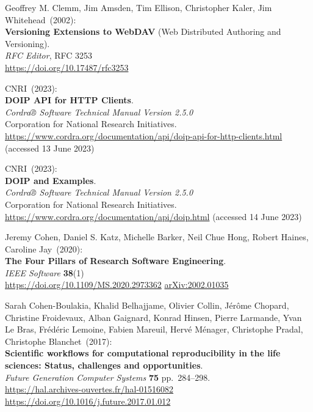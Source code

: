\begin{thebibliography}{9}
Geoffrey M. Clemm, Jim Amsden, Tim Ellison, Christopher Kaler, Jim Whitehead~(2002): \\
\textbf{Versioning Extensions to WebDAV} (Web Distributed Authoring and Versioning).\\
\emph{RFC Editor}, RFC 3253 \\
\url{https://doi.org/10.17487/rfc3253}

CNRI~(2023): \\
\textbf{DOIP API for HTTP Clients}.\\
\emph{Cordra® Software Technical Manual Version 2.5.0}\\
Corporation for National Research Initiatives.\\
\url{https://www.cordra.org/documentation/api/doip-api-for-http-clients.html}
(accessed 13 June 2023)

CNRI~(2023): \\
\textbf{DOIP and Examples}.\\
\emph{Cordra® Software Technical Manual Version 2.5.0}\\
Corporation for National Research Initiatives.\\
\url{https://www.cordra.org/documentation/api/doip.html}
(accessed 14 June 2023)

Jeremy Cohen, Daniel S. Katz, Michelle Barker, Neil Chue Hong, Robert Haines, Caroline Jay~(2020):\\
\textbf{The Four Pillars of Research Software Engineering}.\\
\emph{IEEE Software} \textbf{38}(1)\\
\url{https://doi.org/10.1109/MS.2020.2973362}
\href{https://doi.org/10.48550/arXiv.2002.01035}{arXiv:2002.01035}

Sarah Cohen-Boulakia, Khalid Belhajjame, Olivier Collin, Jérôme Chopard, Christine Froidevaux, Alban Gaignard, Konrad Hinsen, Pierre Larmande, Yvan Le Bras, Frédéric Lemoine, Fabien Mareuil, Hervé Ménager, Christophe Pradal, Christophe Blanchet~(2017): \\
\textbf{Scientific workflows for computational reproducibility in the life sciences: Status, challenges and opportunities}.\\
\emph{Future Generation Computer Systems} \textbf{75} pp.~284--298.\\
\url{https://hal.archives-ouvertes.fr/hal-01516082}\\
\url{https://doi.org/10.1016/j.future.2017.01.012}


\end{thebibliography}
